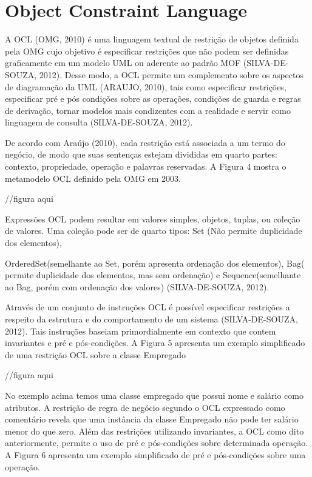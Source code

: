 \section{Object Constraint Language}

A OCL (OMG, 2010) é uma linguagem textual de restrição de objetos definida pela OMG cujo objetivo é especificar restrições que não podem ser definidas graficamente em um modelo UML ou aderente ao padrão MOF (SILVA-DE-SOUZA, 2012). Desse modo, a OCL permite um complemento sobre os aspectos de diagramação da UML (ARAUJO, 2010), tais como especificar restrições, especificar pré e pós condições sobre as operações, condições de guarda e regras de derivação, tornar modelos mais condizentes com a realidade e servir como linguagem de consulta (SILVA-DE-SOUZA, 2012).

De acordo com Araújo (2010), cada restrição está associada a um termo do negócio, de modo que suas sentenças estejam divididas em quarto partes: contexto, propriedade, operação e palavras reservadas. A Figura 4 mostra o metamodelo OCL definido pela OMG em 2003.

//figura aqui


Expressões OCL podem resultar em valores simples, objetos, tuplas, ou coleção de valores. Uma coleção pode ser de quarto tipos: Set (Não permite duplicidade dos elementos),

OrderedSet(semelhante ao Set, porém apresenta ordenação dos elementos), Bag( permite duplicidade dos elementos, mas sem ordenação) e Sequence(semelhante ao Bag, porém com ordenação dos valores) (SILVA-DE-SOUZA, 2012).


Através de um conjunto de instruções OCL é possível especificar restrições a respeito da estrutura e do comportamento de um sistema (SILVA-DE-SOUZA, 2012). Tais instruções baseiam primordialmente em contexto que contem invariantes e pré e pós-condições. A Figura 5 apresenta um exemplo simplificado de uma restrição OCL sobre a classe Empregado

//figura aqui

No exemplo acima temos uma classe empregado que possui nome e salário como atributos. A restrição de regra de negócio segundo o OCL expressado como comentário revela que uma instância da classe Empregado não pode ter salário menor do que zero. Além das restrições utilizando invariantes, a OCL como dito anteriormente, permite o uso de pré e pós-condições sobre determinada operação. A Figura 6 apresenta um exemplo simplificado de pré e pós-condições sobre uma operação.

